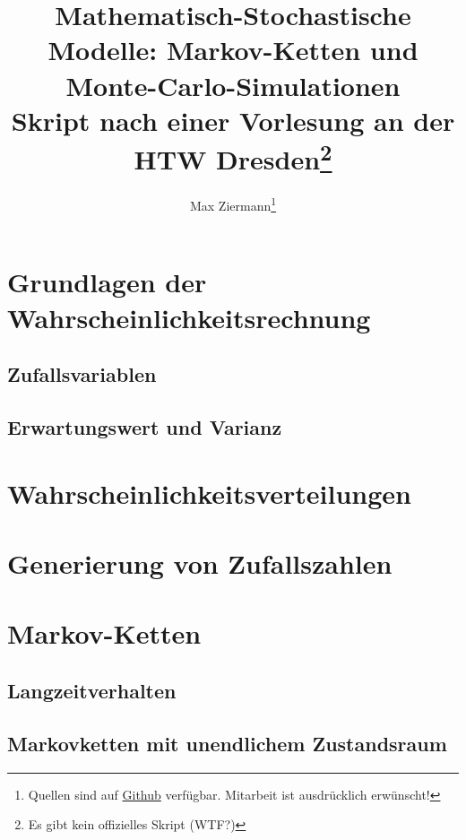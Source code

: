 \documentclass{report}
\title{%
\huge\textbf{Mathematisch-Stochastische Modelle: Markov-Ketten und Monte-Carlo-Simulationen} \\
[2em]\large Skript nach einer Vorlesung an der HTW Dresden\thanks{Es gibt kein
offizielles Skript (WTF?)}}
\author{Max Ziermann\thanks{Quellen sind auf \href{https://github.com/burrscurr/msm}
{Github} verfügbar. Mitarbeit ist ausdrücklich erwünscht!}}
\theoremstyle{lemmastyle}
\begin{document}
  \maketitle

  \tableofcontents

  \chapter{Grundlagen der Wahrscheinlichkeitsrechnung}
    
    \section{Zufallsvariablen}
    
    \section{Erwartungswert und Varianz}
    

  \chapter{Wahrscheinlichkeitsverteilungen}
    

  \chapter{Generierung von Zufallszahlen}
    

  

  \chapter{Markov-Ketten}
    
    \section{Langzeitverhalten}
    
    \section{Markovketten mit unendlichem Zustandsraum}
    

  \printbibliography
\end{document}
